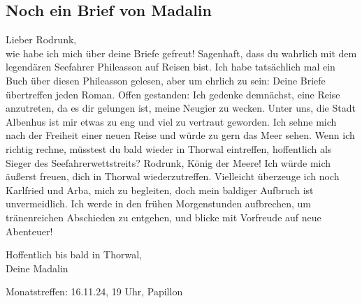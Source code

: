 \documentclass[final]{multiversum}
\begin{document}
\subsection{Noch ein Brief von Madalin}
Lieber Rodrunk,\\
wie habe ich mich über deine Briefe gefreut! Sagenhaft, dass du wahrlich mit dem
legendären Seefahrer Phileasson auf Reisen bist. Ich habe tatsächlich mal ein
Buch über diesen Phileasson gelesen, aber um ehrlich zu sein: Deine Briefe
übertreffen jeden Roman.  Offen gestanden: Ich gedenke demnächst, eine Reise
anzutreten, da es dir gelungen ist, meine Neugier zu wecken. Unter uns, die
Stadt Albenhus ist mir etwas zu eng und viel zu vertraut geworden. Ich sehne
mich nach der Freiheit einer neuen Reise und würde zu gern das Meer sehen. Wenn
ich richtig rechne, müsstest du bald wieder in Thorwal eintreffen, hoffentlich
als Sieger des Seefahrerwettstreits? Rodrunk, König der Meere! Ich würde mich
äußerst freuen, dich in Thorwal wiederzutreffen. Vielleicht überzeuge ich noch
Karlfried und Arba, mich zu begleiten, doch mein baldiger Aufbruch ist
unvermeidlich.  Ich werde in den frühen Morgenstunden aufbrechen, um
tränenreichen Abschieden zu entgehen, und blicke mit Vorfreude auf neue
Abenteuer!

\noindent Hoffentlich bis bald in Thorwal,\\
Deine Madalin
\begin{termine}
  \item Monatstreffen: 16.11.24, 19 Uhr, Papillon
\end{termine}
\impressum
\end{document}
